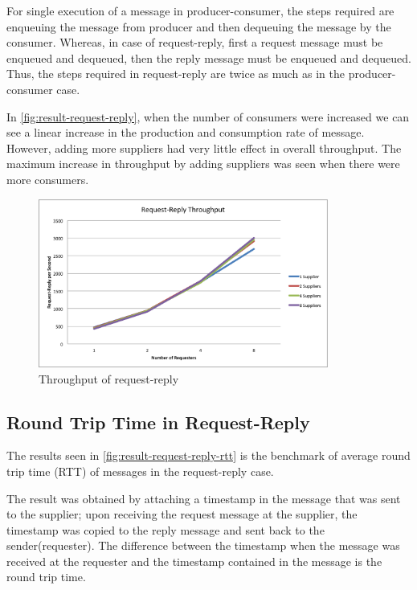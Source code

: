   For single execution of a message in producer-consumer, the steps required are enqueuing the message from producer and then dequeuing the message by the consumer. Whereas, in case of request-reply, first a request message must be enqueued and dequeued, then the reply message must be enqueued and dequeued. Thus, the steps required in request-reply are twice as much as in the producer-consumer case.

  In \autoref{fig:result-request-reply}, when the number of consumers were increased we can see a linear increase in the production and consumption rate of message. However, adding more suppliers had very little effect in overall throughput. The maximum increase in throughput by adding suppliers was seen when there were more consumers.
\begin{figure}[H]
  \centering
  \includegraphics[width=0.85\textwidth]{figures/09request-reply}
  \caption[Throughput of request-reply]{Throughput of request-reply}
  \label{fig:result-request-reply}
\end{figure}

\subsection{Round Trip Time in Request-Reply}
\label{subsec:request-reply-rtt}
  The results seen in \autoref{fig:result-request-reply-rtt} is the benchmark of average round trip time (RTT) of messages in the request-reply case.

  The result was obtained by attaching a timestamp in the message that was sent to the supplier; upon receiving the request message at the supplier, the timestamp was copied to the reply message and sent back to the sender(requester). The difference between the timestamp when the message was received at the requester and the timestamp contained in the message is the round trip time.

